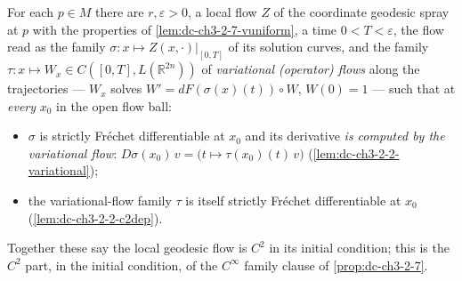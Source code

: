 \begin{lemma}
  \label{lem:dc-ch3-2-7-c2flow}


  For each $p \in M$ there are $r, \varepsilon > 0$, a local flow $Z$ of the
  coordinate geodesic spray at $p$ with the properties of
  \cref{lem:dc-ch3-2-7-vuniform}, a time $0 < T < \varepsilon$, the flow read
  as the family $\sigma : x \mapsto Z(x, \cdot)|_{[0,T]}$ of its solution
  curves, and the family $\tau : x \mapsto W_x \in C([0,T],
  L(\mathbb{R}^{2n}))$ of \emph{variational (operator) flows} along the
  trajectories — $W_x$ solves $W' = dF(\sigma(x)(t)) \circ W$, $W(0) = 1$ —
  such that at \emph{every} $x_0$ in the open flow ball:
  \begin{itemize}
  \item $\sigma$ is strictly Fr\'echet differentiable at $x_0$ and its
    derivative \emph{is computed by the variational flow}:
    $D\sigma(x_0)\,v = \big(t \mapsto \tau(x_0)(t)\,v\big)$
    (\cref{lem:dc-ch3-2-2-variational});
  \item the variational-flow family $\tau$ is itself strictly Fr\'echet
    differentiable at $x_0$ (\cref{lem:dc-ch3-2-2-c2dep}).
  \end{itemize}
  Together these say the local geodesic flow is $C^2$ in its initial
  condition; this is the $C^2$ part, in the initial condition, of the
  $C^\infty$ family clause of \cref{prop:dc-ch3-2-7}.
\end{lemma}
